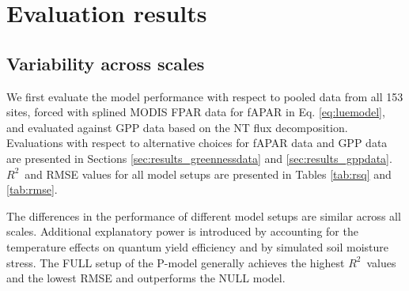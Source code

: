 \documentclass{myreport}
\newcommand{\rsq}{$R^2$}
\begin{document}
\section{Evaluation results}
\label{sec:results}

\subsection{Variability across scales}

We first evaluate the model performance with respect to pooled data from all 153 sites, forced with splined MODIS FPAR data for fAPAR in Eq. \ref{eq:luemodel}, and evaluated against GPP data based on the NT flux decomposition. Evaluations with respect to alternative choices for fAPAR data and GPP data are presented in Sections \ref{sec:results_greennessdata} and \ref{sec:results_gppdata}. \rsq\ and RMSE values for all model setups are presented in Tables \ref{tab:rsq} and \ref{tab:rmse}.

The differences in the performance of different model setups are similar across all scales. Additional explanatory power is introduced by accounting for the temperature effects on quantum yield efficiency and by simulated soil moisture stress. The FULL setup of the P-model generally achieves the highest \rsq\ values and the lowest RMSE and outperforms the NULL model.


\end{document}
